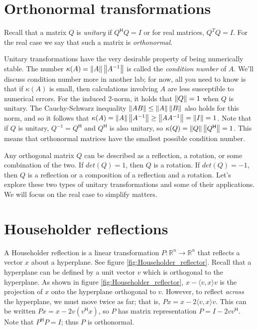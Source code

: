 \label{lab:Canonical Transformations}

\section*{Orthonormal transformations}
Recall that a matrix $Q$ is \emph{unitary} if $Q^\mathsf{H} Q = I$ or for real matrices,
$Q^T Q = I$.
For the real case we say that such a matrix is \emph{orthonormal}.

Unitary transformations have the very desirable property of being numerically stable.
The number $\kappa(A) = \left\lVert A\right\rVert \left\lVert A^{-1}\right\rVert$ is called the \emph{condition number} of $A$.
We'll discuss condition number more in another lab; for now, all you need to know is that if $\kappa(A)$ is small, then calculations involving $A$ are less susceptible to numerical errors.
For the induced 2-norm, it holds that $\left\lVert Q\right\rVert=1$ when $Q$ is unitary.
The Cauchy-Schwarz inequality $\left\lVert AB\right\rVert \leq \left\lVert A\right\rVert \left\lVert B\right\rVert$ also holds for this norm, and
so it follows that $\kappa(A) = \left\lVert A\right\rVert \left\lVert A^{-1}\right\rVert \geq \left\lVert A A^{-1}\right\rVert = \left\lVert I\right\rVert = 1$.
Note that if $Q$ is unitary, $Q^{-1} = Q^\mathsf{H}$ and $Q^\mathsf{H}$ is also unitary, so $\kappa(Q) = \left\lVert Q\right\rVert \left\lVert Q^\mathsf{H}\right\rVert = 1$.
This means that orthonormal matrices have the smallest possible condition number.

Any orthogonal matrix $Q$ can be described as a reflection, a rotation, or some combination of the two.
If $det(Q) = 1$, then $Q$ is a rotation.
If $det(Q) = -1$, then $Q$  is a reflection or a composition of a reflection and a rotation.
Let's explore these two types of unitary transformations and some of their applications.
We will focus on the real case to simplify matters.

\section*{Householder reflections}
A Householder reflection is a linear transformation $P: \mathbb{R}^n \rightarrow \mathbb{R}^n$ that reflects a vector $x$ about a hyperplane.
See figure \ref{fig:Householder_reflector}.
Recall that a hyperplane can be defined by a unit vector $v$ which is orthogonal to the hyperplane.
As shown in figure \ref{fig:Householder_reflector}, $x - \langle v,x \rangle v$ is the projection of $x$ onto the hyperplane orthogonal to $v$.
However, to reflect \emph{across} the hyperplane, we must move twice as far; that is, $Px = x - 2\langle v,x \rangle v$.
This can be written $Px = x - 2v(v^\mathsf{H} x)$, so $P$ has matrix representation $P = I - 2v v^\mathsf{H}$.
Note that $P^\mathsf{H} P = I$; thus $P$ is orthonormal.

